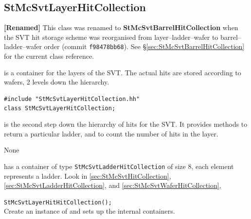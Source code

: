 \subsection{StMcSvtLayerHitCollection}
 
\label{sec:StMcSvtLayerHitCollection}
\textbf{[Renamed]} This class was renamed to \textbf{StMcSvtBarrelHitCollection}
when the SVT hit storage scheme was reorganised from layer--ladder--wafer to
barrel--ladder--wafer order (commit \texttt{f98478bb68}).
See \S\ref{sec:StMcSvtBarrelHitCollection} for the current class reference.
\begin{Entry}
\item[Summary]
     is a container for the
    layers of the SVT.  The actual hits are stored according to
    wafers, 2 levels down the hierarchy.

\item[Synopsis]
    \verb+#include "StMcSvtLayerHitCollection.hh"+\\
    \verb+class StMcSvtLayerHitCollection;+\\

\item[Description]
     is the second step down
    the hierarchy of hits for the SVT.  It provides
    methods to return a particular ladder, and to
    count the number of hits in the layer.

\item[Persistence]
    None

\item[Related Classes]
    has a container of type {\tt StMcSvtLadderHitCollection}
    of size 8, each element represents a ladder.  Look in
     \ref{sec:StMcSvtHitCollection},
     \ref{sec:StMcSvtLadderHitCollection},
    and  \ref{sec:StMcSvtWaferHitCollection},

\item[Public\\ Constructors]
    \verb+StMcSvtLayerHitHitCollection();+\\
    Create an instance of 
    and sets up the internal containers.

\item[Public Member\\ Functions]


\end{Entry}
